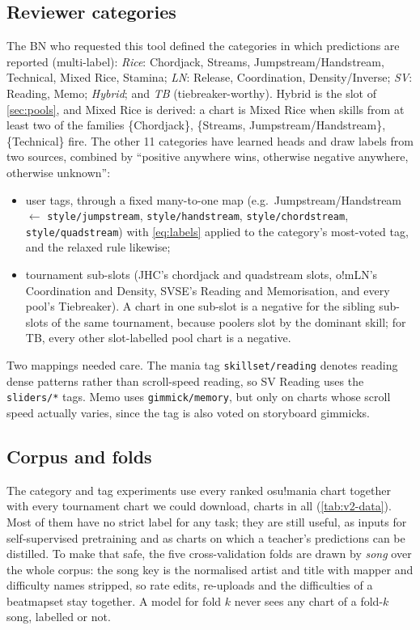 \documentclass[10pt,twocolumn]{article}
\newcommand{\utag}[1]{\texttt{\small #1}}
\begin{document}
\subsection{Reviewer categories}\label{sec:categories}
The BN who requested this tool defined the categories in which predictions are reported (multi-label): \emph{Rice}: Chordjack, Streams, Jumpstream/Handstream, Technical, Mixed Rice, Stamina; \emph{LN}: Release, Coordination, Density/Inverse; \emph{SV}: Reading, Memo; \emph{Hybrid}; and \emph{TB} (tiebreaker-worthy). Hybrid is the slot of \cref{sec:pools}, and Mixed Rice is derived: a chart is Mixed Rice when skills from at least two of the families \{Chordjack\}, \{Streams, Jumpstream/Handstream\}, \{Technical\} fire. The other 11 categories have learned heads and draw labels from two sources, combined by ``positive anywhere wins, otherwise negative anywhere, otherwise unknown'':
\begin{itemize}\setlength\itemsep{1pt}
\item user tags, through a fixed many-to-one map (e.g.\ Jumpstream/Handstream $\leftarrow$ \utag{style/jumpstream}, \utag{style/handstream}, \utag{style/chordstream}, \utag{style/quadstream}) with \cref{eq:labels} applied to the category's most-voted tag, and the relaxed rule likewise;
\item tournament sub-slots (JHC's chordjack and quadstream slots, o!mLN's Coordination and Density, SVSE's Reading and Memorisation, and every pool's Tiebreaker). A chart in one sub-slot is a negative for the sibling sub-slots of the same tournament, because poolers slot by the dominant skill; for TB, every other slot-labelled pool chart is a negative.
\end{itemize}
Two mappings needed care. The mania tag \utag{skillset/reading} denotes reading dense patterns rather than scroll-speed reading, so SV Reading uses the \utag{sliders/*} tags. Memo uses \utag{gimmick/memory}, but only on charts whose scroll speed actually varies, since the tag is also voted on storyboard gimmicks.

\subsection{Corpus and folds}\label{sec:corpus}
The category and tag experiments use every ranked osu!mania chart together with every tournament chart we could download, \nCharts{} charts in all (\cref{tab:v2-data}). Most of them have no strict label for any task; they are still useful, as inputs for self-supervised pretraining and as charts on which a teacher's predictions can be distilled. To make that safe, the five cross-validation folds are drawn by \emph{song} over the whole corpus: the song key is the normalised artist and title with mapper and difficulty names stripped, so rate edits, re-uploads and the difficulties of a beatmapset stay together. A model for fold $k$ never sees any chart of a fold-$k$ song, labelled or not.
\end{document}
